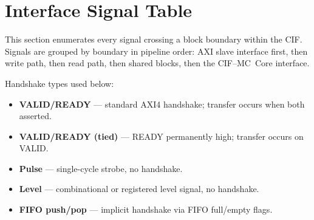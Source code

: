\section{Interface Signal Table}

This section enumerates every signal crossing a block boundary within the CIF.
Signals are grouped by boundary in pipeline order: AXI slave interface first,
then write path, then read path, then shared blocks, then the CIF--MC~Core
interface.

Handshake types used below:
\begin{itemize}
  \item \textbf{VALID/READY} --- standard AXI4 handshake; transfer occurs when both asserted.
  \item \textbf{VALID/READY (tied)} --- READY permanently high; transfer occurs on VALID.
  \item \textbf{Pulse} --- single-cycle strobe, no handshake.
  \item \textbf{Level} --- combinational or registered level signal, no handshake.
  \item \textbf{FIFO push/pop} --- implicit handshake via FIFO full/empty flags.
\end{itemize}


